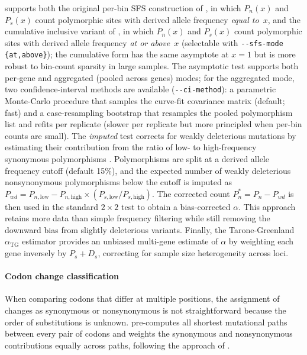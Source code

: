 \mkado{} supports both the original per-bin SFS construction of
\citet{messer2013}, in which $P_n(x)$ and $P_s(x)$ count
polymorphic sites with derived allele frequency \emph{equal to}~$x$,
and the cumulative inclusive variant of \citet{uricchio2019}, in
which $P_n(x)$ and $P_s(x)$ count polymorphic sites with derived
allele frequency \emph{at or above}~$x$ (selectable with
\texttt{-{}-sfs-mode \{at,above\}}); the cumulative form has the
same asymptote at $x = 1$ but is more robust to bin-count sparsity
in large samples.
The asymptotic test supports both per-gene
and aggregated (pooled across genes) modes; for the aggregated
mode, two confidence-interval methods are available
(\texttt{-{}-ci-method}): a parametric Monte-Carlo procedure that
samples the curve-fit covariance matrix (default; fast) and a
case-resampling bootstrap that resamples the pooled polymorphism
list and refits per replicate (slower per replicate but more
principled when per-bin counts are small).
The \textit{imputed} test corrects for weakly deleterious mutations
by estimating their contribution from the ratio
of low- to high-frequency synonymous polymorphisms
\citep{murga-moreno2022}.
Polymorphisms are split at a derived allele frequency %
cutoff (default 15\%),
and the expected number of weakly deleterious nonsynonymous
polymorphisms below the cutoff is imputed as
$P_{wd} = P_{n,\text{low}} - P_{n,\text{high}} \times
(P_{s,\text{low}} / P_{s,\text{high}})$.
The corrected count $P_{n}^{*} = P_n - P_{wd}$
is then used in the standard $2 \times 2$ test
to obtain a bias-corrected $\alpha$.
This approach retains more data than simple frequency filtering
while still removing the downward bias from slightly deleterious
variants.
Finally, the Tarone-Greenland $\alpha_\text{TG}$ estimator
\citep{stoletzki2011}
provides an unbiased multi-gene estimate of $\alpha$
by weighting each gene inversely by $P_s + D_s$,
correcting for sample size heterogeneity across loci.

\paragraph{Codon change classification}
When comparing codons that differ at multiple positions,
the assignment of changes as synonymous or nonsynonymous
is not straightforward
because the order of substitutions is unknown.
\mkado pre-computes all shortest mutational paths
between every pair of codons
and weights the synonymous and nonsynonymous contributions
equally across paths,
following the approach of \citet{nei1986}.

